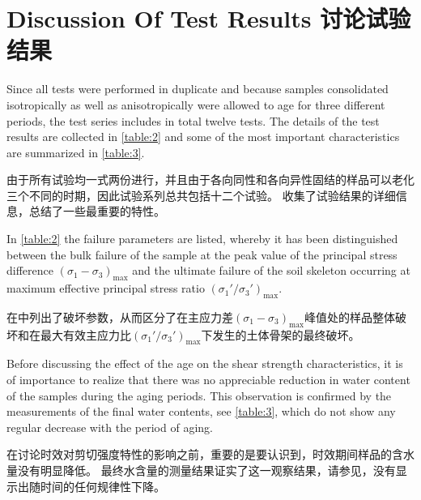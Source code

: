 \section{Discussion Of Test Results 讨论试验结果}



\begin{paracol}{2}
    
    Since all tests were performed in duplicate and because samples consolidated isotropically as well as anisotropically were allowed to age for three different periods, the test series includes in total twelve tests. The details of the test results are collected in \autoref{table:2} and some of the most important characteristics are summarized in \autoref{table:3}.

    \switchcolumn

    由于所有试验均一式两份进行，并且由于各向同性和各向异性固结的样品可以老化三个不同的时期，因此试验系列总共包括十二个试验。 收集了试验结果的详细信息，总结了一些最重要的特性。

    \switchcolumn*

    In \autoref{table:2} the failure parameters are listed, whereby it has been distinguished between the bulk failure of the sample at the peak value of the principal stress difference $(\sigma_1-\sigma_3)_{\max}$ and the ultimate failure of the soil skeleton occurring at maximum effective principal stress ratio $(\sigma_1'/\sigma_3')_{\max}$.

    \switchcolumn
       
    在中列出了破坏参数，从而区分了在主应力差$(\sigma_1-\sigma_3)_{\max}$峰值处的样品整体破坏和在最大有效主应力比$(\sigma_1'/\sigma_3')_{\max}$下发生的土体骨架的最终破坏。
    
    \switchcolumn*

    Before discussing the effect of the age on the shear strength characteristics, it is of importance to realize that there was no appreciable reduction in water content of the samples during the aging periods. This observation is confirmed by the measurements of the final water contents, see \autoref{table:3}, which do not show any regular decrease with the period of aging.

    \switchcolumn

    在讨论时效对剪切强度特性的影响之前，重要的是要认识到，时效期间样品的含水量没有明显降低。 最终水含量的测量结果证实了这一观察结果，请参见，没有显示出随时间的任何规律性下降。


\end{paracol}
